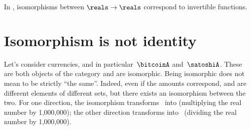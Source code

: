 \begin{example}
	In \Set, isomorphisms between $\reals\to \reals$ correspond to invertible functions.
\end{example}

\section{Isomorphism is not identity}
\begin{example}
	Let's consider currencies, and in particular~$\bitcoinA$ and~$\satoshiA$.
	These are both objects of the category \Curr and are isomorphic.
	Being isomorphic does not mean to be strictly ``the same''.
	Indeed, even if the amounts correspond, \unit[1]{\bitcoinA} and \unit[1,000,000]{\satoshiA} are different elements of different sets, but there exists an isomorphism between the two.
	For one direction, the isomorphism transforms \bitcoinA \ into \satoshiA (multiplying the real number by 1,000,000);
	the other direction transforms \satoshiA into \bitcoinA \ (dividing the real number by 1,000,000).
\end{example}

